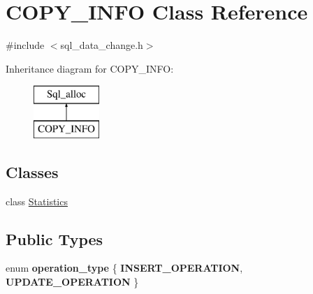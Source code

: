 \hypertarget{classCOPY__INFO}{}\section{C\+O\+P\+Y\+\_\+\+I\+N\+FO Class Reference}
\label{classCOPY__INFO}


{\ttfamily \#include $<$sql\+\_\+data\+\_\+change.\+h$>$}

Inheritance diagram for C\+O\+P\+Y\+\_\+\+I\+N\+FO\+:\begin{figure}[H]
\begin{center}
\leavevmode
\includegraphics[height=2.000000cm]{classCOPY__INFO}
\end{center}
\end{figure}
\subsection*{Classes}
\begin{DoxyCompactItemize}
\item 
class \mbox{\hyperlink{classCOPY__INFO_1_1Statistics}{Statistics}}
\end{DoxyCompactItemize}
\subsection*{Public Types}
\begin{DoxyCompactItemize}
\item 
\mbox{\label{classCOPY__INFO_a2c75f8423ff1891b6cdb99ea6cd6d316}} 
enum {\bfseries operation\+\_\+type} \{ {\bfseries I\+N\+S\+E\+R\+T\+\_\+\+O\+P\+E\+R\+A\+T\+I\+ON}, 
{\bfseries U\+P\+D\+A\+T\+E\+\_\+\+O\+P\+E\+R\+A\+T\+I\+ON}
 \}
\end{DoxyCompactItemize}
